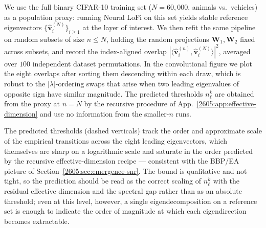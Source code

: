 

We use the full binary CIFAR-10 training set ($N=60{,}000$, animals
vs.\ vehicles) as a population proxy: running Neural LoFi on this set
yields stable reference eigenvectors $\{\hat{\bm v}_i^{(N)}\}_{i\ge 1}$
at the layer of interest.  We then refit the same pipeline on random
subsets of size $n\le N$, holding the random projections $\bm W_1,\bm
W_2$ fixed across subsets, and record the index-aligned overlap
$|\langle \hat{\bm v}_i^{(n)},\hat{\bm v}_i^{(N)}\rangle|^2$, averaged
over $100$ independent dataset permutations.  In the convolutional
figure we plot the eight overlaps after sorting them descending within
each draw, which is robust to the $|\lambda|$-ordering swaps that arise
when two leading eigenvalues of opposite sign have similar magnitude.  The predicted thresholds $n_\ell^k$
are obtained from the proxy at $n=N$ by the recursive procedure of
App.~\ref{2605:app:effective-dimension} and use no information from the
smaller-$n$ runs.

The predicted thresholds (dashed verticals) track the order and
approximate scale of the empirical transitions across the eight leading
eigenvectors, which themselves are sharp on a logarithmic scale and
saturate in the order predicted by the recursive effective-dimension
recipe — consistent with the BBP/EA picture of
Section~\ref{2605:sec:emergence-snr}.  The bound is qualitative and not
tight, so the prediction should be read as the correct scaling of
$n^k_\ell$ with the residual effective dimension and the spectral gap
rather than as an absolute threshold; even at this level, however, a
single eigendecomposition on a reference set is enough to indicate the
order of magnitude at which each eigendirection becomes extractable.

